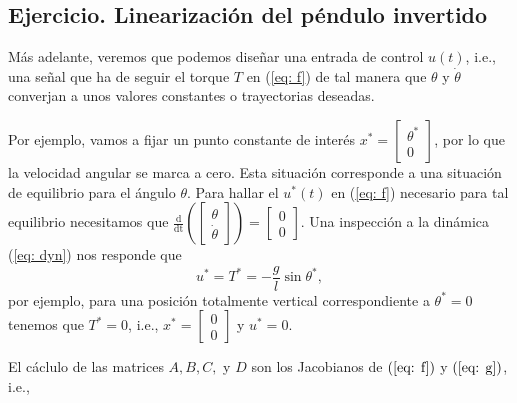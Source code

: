 \subsection{Ejercicio. Linearización del péndulo invertido}
Más adelante, veremos que podemos diseñar una entrada de control $u(t)$, i.e., una señal que ha de seguir el torque $T$ en (\ref{eq: f}) de tal manera que $\theta$ y $\dot\theta$ converjan a unos valores constantes o trayectorias deseadas.

Por ejemplo, vamos a fijar un punto constante de interés $x^* = \begin{bmatrix}\theta^* \\ 0\end{bmatrix}$, por lo que la velocidad angular se marca a cero. Esta situación corresponde a una situación de equilibrio para el ángulo $\theta$. Para hallar el $u^*(t)$ en (\ref{eq: f}) necesario para tal equilibrio necesitamos que $\frac{\mathrm{d}}{\mathrm{dt}}\left(\begin{bmatrix}\theta \\ \dot\theta \end{bmatrix}\right) = \begin{bmatrix}0 \\ 0 \end{bmatrix}$. Una inspección a la dinámica (\ref{eq: dyn}) nos responde que
\begin{equation}
	u^* = T^* = -\frac{g}{l}\sin\theta^*,
\end{equation}
por ejemplo, para una posición totalmente vertical correspondiente a $\theta^* = 0$ tenemos que $T^*=0$, i.e., $x^* = \begin{bmatrix}0\\0\end{bmatrix}$ y $u^* = 0$.

El cáclulo de las matrices $A,B,C,$ y $D$ son los Jacobianos de $(\ref{eq: f})$ y $(\ref{eq: g})$, i.e.,

